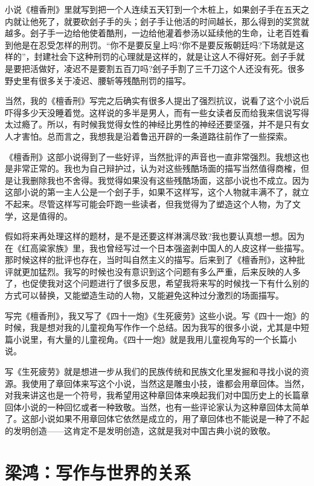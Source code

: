 \documentclass[12pt,a5paper]{ctexbook}
\begin{document}
小说《檀香刑》里就写到把一个人连续五天钉到一个木桩上，如果刽子手在五天之内就让他死了，就要砍刽子手的头；刽子手让他活的时间越长，那么得到的奖赏就越多。刽子手一边给他使着酷刑，一边给他灌着参汤以延续他的生命，让老百姓看到他是在忍受怎样的刑罚。“你不是要反皇上吗?你不是要反叛朝廷吗?下场就是这样的”，封建社会下这种刑罚的心理就是这样的，就是让这人不得好死。刽子手就是要把活做好，凌迟不是要割五百刀吗?刽子手割了三千刀这个人还没有死。很多野史里有很多关于凌迟、腰斩等残酷刑罚的描写。

当然，我的《檀香刑》写完之后确实有很多人提出了强烈抗议，说看了这个小说后吓得多少天没睡着觉。这样说的多半是男人，而有一些女读者反而给我来信说写得太过瘾了。所以，有时候我觉得女性的神经比男性的神经还要坚强，并不是只有女人才害怕。总而言之，我想我是沿着鲁迅开辟的一条道路往前作了一些探索。

《檀香刑》这部小说得到了一些好评，当然批评的声音也一直非常强烈。我想这也是非常正常的。我也为自己辩护过，认为对这些残酷场面的描写当然值得商榷，但是让我删除我也不舍得。我觉得如果没有这些残酷场面，这部小说也不成立。因为这部小说的第一主人公是一个刽子手，如果不这样写，这个人物就丰满不了，就立不起来。尽管这样写可能会吓跑一些读者，但我觉得为了塑造这个人物，为了文学，这是值得的。

假如将来再处理这样的题材，是不是还要这样淋漓尽致?我也要认真想一想。因为在《红高粱家族》里，我也曾经写过一个日本强盗剥中国人的人皮这样一些描写。那时候这样的批评也存在，当时叫自然主义的描写。后来到了《檀香刑》，这种批评就更加猛烈。我写的时候也没有意识到这个问题有多么严重，后来反映的人多了，也促使我对这个问题进行了很多反思，希望我将来写的时候找一下有什么别的方式可以替换，又能塑造生动的人物，又能避免这种过分激烈的场面描写。

写完《檀香刑》，我又写了《四十一炮》《生死疲劳》这些小说。写《四十一炮》的时候，我是想对我的儿童视角写作作一个总结。因为我写的很多小说，尤其是中短篇小说里，有大量的儿童视角。《四十一炮》就是我用儿童视角写的一个长篇小说。

写《生死疲劳》就是想进一步从我们的民族传统和民族文化里发掘和寻找小说的资源。我使用了章回体来写这个小说，当然这是雕虫小技，谁都会用章回体。当然，对我来讲这也是一个符号，我希望用这种章回体来唤起我们对中国历史上的长篇章回体小说的一种回忆或者一种致敬。当然，也有一些评论家认为这种章回体太简单了。这部小说如果不用章回体它依然是成立的，用了章回体也不能说是一种了不起的发明创造——这肯定不是发明创造，这就是我对中国古典小说的致敬。

\newpage

\section{梁鸿：写作与世界的关系}
\end{document}
